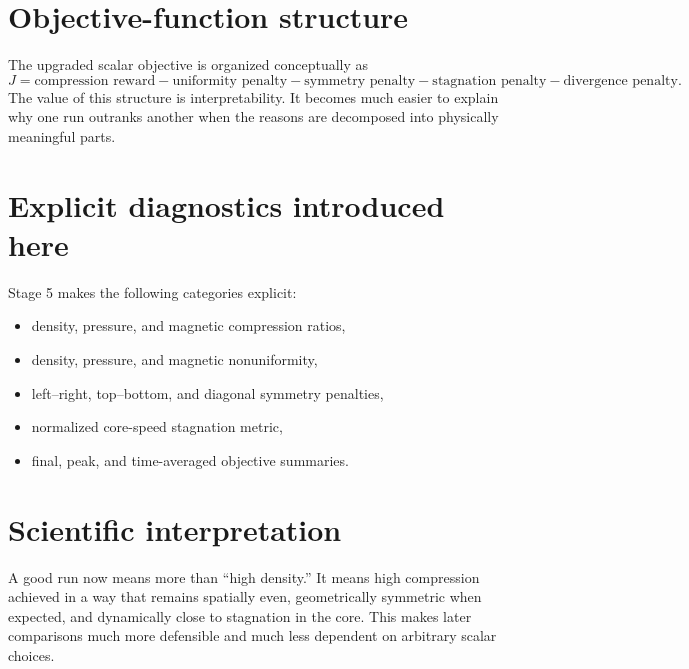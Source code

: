 \documentclass[11pt]{article}
\begin{document}
\section{Objective-function structure}
The upgraded scalar objective is organized conceptually as
\[
J = \text{compression reward} - \text{uniformity penalty} - \text{symmetry penalty} - \text{stagnation penalty} - \text{divergence penalty}.
\]
The value of this structure is interpretability. It becomes much easier to explain why one run outranks another when the reasons are decomposed into physically meaningful parts.

\section{Explicit diagnostics introduced here}
Stage 5 makes the following categories explicit:
\begin{itemize}[leftmargin=1.8em]
    \item density, pressure, and magnetic compression ratios,
    \item density, pressure, and magnetic nonuniformity,
    \item left--right, top--bottom, and diagonal symmetry penalties,
    \item normalized core-speed stagnation metric,
    \item final, peak, and time-averaged objective summaries.
\end{itemize}

\section{Scientific interpretation}
A good run now means more than ``high density.'' It means high compression achieved in a way that remains spatially even, geometrically symmetric when expected, and dynamically close to stagnation in the core. This makes later comparisons much more defensible and much less dependent on arbitrary scalar choices.
\end{document}
